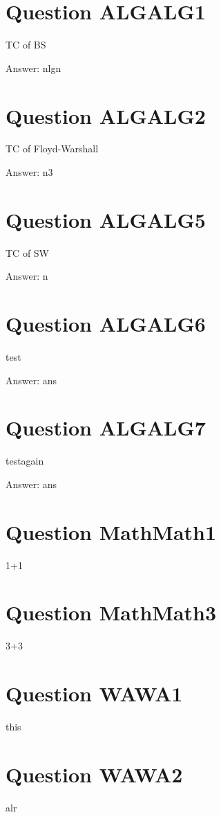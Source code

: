 

\section{Question ALGALG1}

TC of BS

Answer: nlgn


\section{Question ALGALG2}

TC of Floyd-Warshall

Answer: n3


\section{Question ALGALG5}

TC of SW

Answer: n


\section{Question ALGALG6}

test

Answer: ans


\section{Question ALGALG7}

testagain

Answer: ans


\section{Question MathMath1}

1+1



\section{Question MathMath3}

3+3



\section{Question WAWA1}

this



\section{Question WAWA2}

alr

